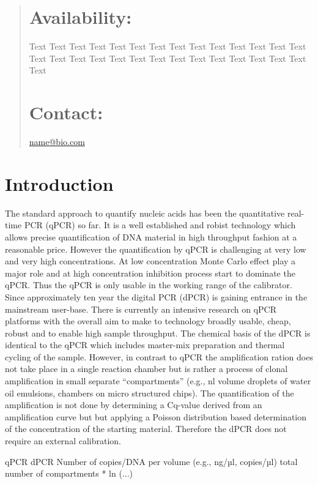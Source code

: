 \documentclass{bioinfo}
\begin{document}
\begin{abstract}
\section{Availability:}
Text  Text Text Text Text Text Text Text Text Text  Text Text Text Text Text Text Text Text Text  Text Text Text Text Text Text Text Text Text  Text

\section{Contact:} \href{name@bio.com}{name@bio.com}
\end{abstract}

\section{Introduction}

The standard approach to quantify nucleic acids has been the quantitative real-time PCR (qPCR) so far. It is a well established and robist technology which allows precise quantification of DNA material in high throughput fashion at a reasonable price. However the quantification by qPCR is challenging at very low and very high concentrations. At low concentration Monte Carlo effect play a major role and at high concentration inhibition process start to dominate the qPCR. Thus the qPCR is only usable in the working range of the calibrator. Since approximately ten year the digital PCR (dPCR) is gaining entrance in the mainstream user-base. There is currently an intensive research on qPCR platforms with the overall aim to make to technology broadly usable, cheap, robust and to enable high sample throughput. The chemical basis of the dPCR is identical to the qPCR which includes master-mix preparation and thermal cycling of the sample. However, in contrast to qPCR the amplification ration does not take place in a single reaction chamber but is rather a process of clonal amplification in small separate “compartments” (e.g., nl volume droplets of water oil emulsions, chambers on micro structured chips). The quantification of the amplification is not done by determining a Cq-value derived from an amplification curve but but applying a Poisson distribution based determination of the concentration of the starting material. Therefore the dPCR does not require an external calibration.

qPCR	dPCR
Number of copies/DNA per volume (e.g., ng/µl, copies/µl)	total number of compartments * ln (...)
\end{document}
